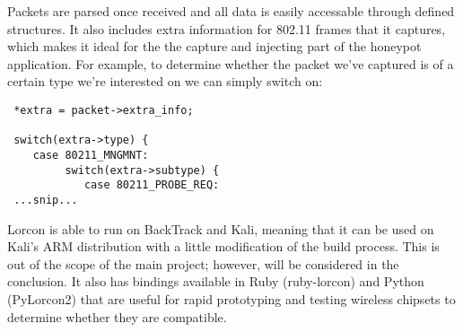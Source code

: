 Packets are parsed once received and all data is easily accessable through defined structures. It also includes extra information for 802.11 frames that it captures, which makes it ideal for the the capture and injecting part of the honeypot application. For example, to determine whether the packet we've captured is of a certain type we're interested on we can simply switch on:
\begin{verbatim}
 *extra = packet->extra_info;

 switch(extra->type) {
 	case 80211_MNGMNT:
 		 switch(extra->subtype) {
 		 	case 80211_PROBE_REQ:
 ...snip...
\end{verbatim}
Lorcon is able to run on BackTrack and Kali, meaning that it can be used on Kali's ARM distribution with a little modification of the build process. This is out of the scope of the main project; however, will be considered in the conclusion. It also has bindings available in Ruby (ruby-lorcon) and Python (PyLorcon2) that are useful for rapid prototyping and testing wireless chipsets to determine whether they are compatible.

